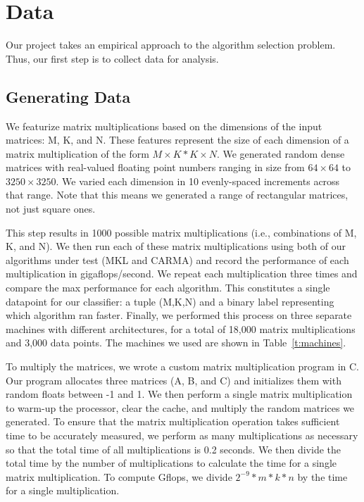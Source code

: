 \section{Data}
Our project takes an empirical approach to the algorithm selection problem.
Thus, our first step is to collect data for analysis.

\subsection{Generating Data}
We featurize matrix multiplications based on the dimensions of the input matrices: M, K, and N.
These features represent the size of each dimension of a matrix multiplication of the form $M\times{K} * K\times{N}$.
We generated random dense matrices with real-valued floating point numbers ranging in size from $64\times{64}$ to $3250\times{3250}$.
We varied each dimension in 10 evenly-spaced increments across that range.
Note that this means we generated a range of rectangular matrices, not just square ones.

This step results in 1000 possible matrix multiplications (i.e., combinations of M, K, and N).
We then run each of these matrix multiplications using both of our algorithms under test (MKL and CARMA) and record the performance of each multiplication in gigaflops/second.
We repeat each multiplication three times and compare the max performance for each algorithm.
This constitutes a single datapoint for our classifier: a tuple (M,K,N) and a binary label representing which algorithm ran faster.
Finally, we performed this process on three separate machines with different architectures, for a total of 18,000 matrix multiplications and 3,000 data points.
The machines we used are shown in Table~\ref{t:machines}.

To multiply the matrices, we wrote a custom matrix multiplication program in C.
Our program allocates three matrices (A, B, and C) and initializes them with random floats between -1 and 1.
We then perform a single matrix multiplication to warm-up the processor, clear the cache, and multiply the random matrices we generated.
To ensure that the matrix multiplication operation takes sufficient time to be accurately measured, we perform as many multiplications as necessary so that the total time of all multiplications is 0.2 seconds.
We then divide the total time by the number of multiplications to calculate the time for a single matrix multiplication.
To compute Gflops, we divide $2^{-9} * m * k * n$ by the time for a single multiplication.

